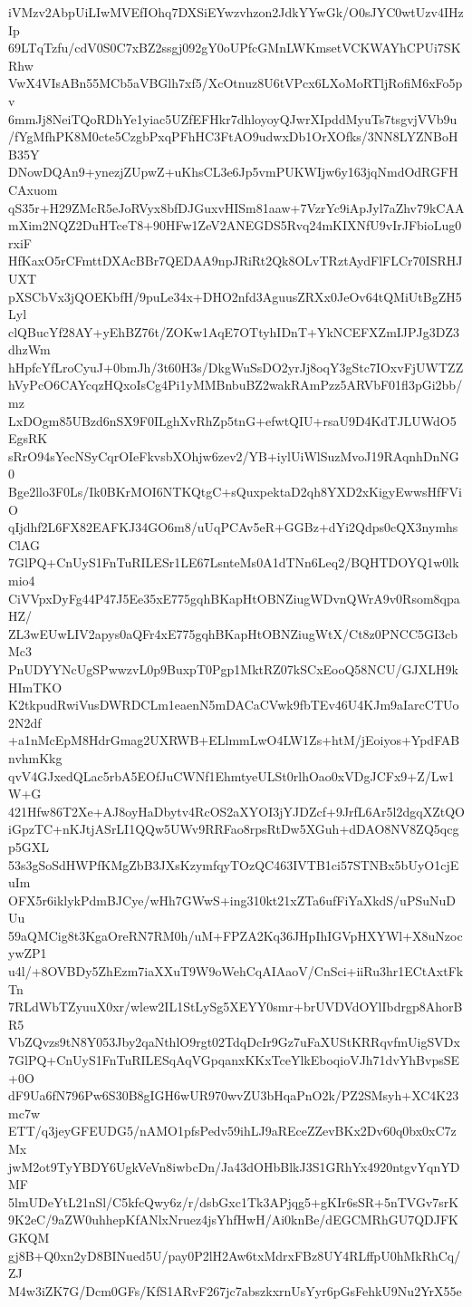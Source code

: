 iVMzv2AbpUiLIwMVEfIOhq7DXSiEYwzvhzon2JdkYYwGk/O0sJYC0wtUzv4IHzIp
69LTqTzfu/cdV0S0C7xBZ2ssgj092gY0oUPfcGMnLWKmsetVCKWAYhCPUi7SKRhw
VwX4VIsABn55MCb5aVBGlh7xf5/XcOtnuz8U6tVPcx6LXoMoRTljRofiM6xFo5pv
6mmJj8NeiTQoRDhYe1yiac5UZfEFHkr7dhloyoyQJwrXIpddMyuTs7tsgvjVVb9u
/fYgMfhPK8M0cte5CzgbPxqPFhHC3FtAO9udwxDb1OrXOfks/3NN8LYZNBoHB35Y
DNowDQAn9+ynezjZUpwZ+uKhsCL3e6Jp5vmPUKWIjw6y163jqNmdOdRGFHCAxuom
qS35r+H29ZMcR5eJoRVyx8bfDJGuxvHISm81aaw+7VzrYc9iApJyl7aZhv79kCAA
mXim2NQZ2DuHTceT8+90HFw1ZeV2ANEGDS5Rvq24mKIXNfU9vIrJFbioLug0rxiF
HfKaxO5rCFmttDXAcBBr7QEDAA9npJRiRt2Qk8OLvTRztAydFlFLCr70ISRHJUXT
pXSCbVx3jQOEKbfH/9puLe34x+DHO2nfd3AguusZRXx0JeOv64tQMiUtBgZH5Lyl
clQBucYf28AY+yEhBZ76t/ZOKw1AqE7OTtyhIDnT+YkNCEFXZmIJPJg3DZ3dhzWm
hHpfcYfLroCyuJ+0bmJh/3t60H3s/DkgWuSsDO2yrJj8oqY3gStc7IOxvFjUWTZZ
hVyPcO6CAYcqzHQxoIsCg4Pi1yMMBnbuBZ2wakRAmPzz5ARVbF01fl3pGi2bb/mz
LxDOgm85UBzd6nSX9F0ILghXvRhZp5tnG+efwtQIU+rsaU9D4KdTJLUWdO5EgsRK
sRrO94sYecNSyCqrOIeFkvsbXOhjw6zev2/YB+iylUiWlSuzMvoJ19RAqnhDnNG0
Bge2llo3F0Ls/Ik0BKrMOI6NTKQtgC+sQuxpektaD2qh8YXD2xKigyEwwsHfFViO
qIjdhf2L6FX82EAFKJ34GO6m8/uUqPCAv5eR+GGBz+dYi2Qdps0cQX3nymhsClAG
7GlPQ+CnUyS1FnTuRILESr1LE67LsnteMs0A1dTNn6Leq2/BQHTDOYQ1w0lkmio4
CiVVpxDyFg44P47J5Ee35xE775gqhBKapHtOBNZiugWDvnQWrA9v0Rsom8qpaHZ/
ZL3wEUwLIV2apys0aQFr4xE775gqhBKapHtOBNZiugWtX/Ct8z0PNCC5GI3cbMc3
PnUDYYNcUgSPwwzvL0p9BuxpT0Pgp1MktRZ07kSCxEooQ58NCU/GJXLH9kHImTKO
K2tkpudRwiVusDWRDCLm1eaenN5mDACaCVwk9fbTEv46U4KJm9aIarcCTUo2N2df
+a1nMcEpM8HdrGmag2UXRWB+ELlmmLwO4LW1Zs+htM/jEoiyos+YpdFABnvhmKkg
qvV4GJxedQLac5rbA5EOfJuCWNf1EhmtyeULSt0rlhOao0xVDgJCFx9+Z/Lw1W+G
421Hfw86T2Xe+AJ8oyHaDbytv4RcOS2aXYOI3jYJDZcf+9JrfL6Ar5l2dgqXZtQO
iGpzTC+nKJtjASrLI1QQw5UWv9RRFao8rpsRtDw5XGuh+dDAO8NV8ZQ5qcgp5GXL
53s3gSoSdHWPfKMgZbB3JXsKzymfqyTOzQC463IVTB1ci57STNBx5bUyO1cjEuIm
OFX5r6iklykPdmBJCye/wHh7GWwS+ing310kt21xZTa6ufFiYaXkdS/uPSuNuDUu
59aQMCig8t3KgaOreRN7RM0h/uM+FPZA2Kq36JHpIhIGVpHXYWl+X8uNzocywZP1
u4l/+8OVBDy5ZhEzm7iaXXuT9W9oWehCqAIAaoV/CnSci+iiRu3hr1ECtAxtFkTn
7RLdWbTZyuuX0xr/wlew2IL1StLySg5XEYY0smr+brUVDVdOYlIbdrgp8AhorBR5
VbZQvzs9tN8Y053Jby2qaNthlO9rgt02TdqDcIr9Gz7uFaXUStKRRqvfmUigSVDx
7GlPQ+CnUyS1FnTuRILESqAqVGpqanxKKxTceYlkEboqioVJh71dvYhBvpsSE+0O
dF9Ua6fN796Pw6S30B8gIGH6wUR970wvZU3bHqaPnO2k/PZ2SMsyh+XC4K23mc7w
ETT/q3jeyGFEUDG5/nAMO1pfsPedv59ihLJ9aREceZZevBKx2Dv60q0bx0xC7zMx
jwM2ot9TyYBDY6UgkVeVn8iwbcDn/Ja43dOHbBlkJ3S1GRhYx4920ntgvYqnYDMF
5lmUDeYtL21nSl/C5kfcQwy6z/r/dsbGxc1Tk3APjqg5+gKIr6sSR+5nTVGv7srK
9K2eC/9aZW0uhhepKfANlxNruez4jsYhfHwH/Ai0knBe/dEGCMRhGU7QDJFKGKQM
gj8B+Q0xn2yD8BINued5U/pay0P2lH2Aw6txMdrxFBz8UY4RLffpU0hMkRhCq/ZJ
M4w3iZK7G/Dcm0GFs/KfS1ARvF267jc7abszkxrnUsYyr6pGsFehkU9Nu2YrX55e
